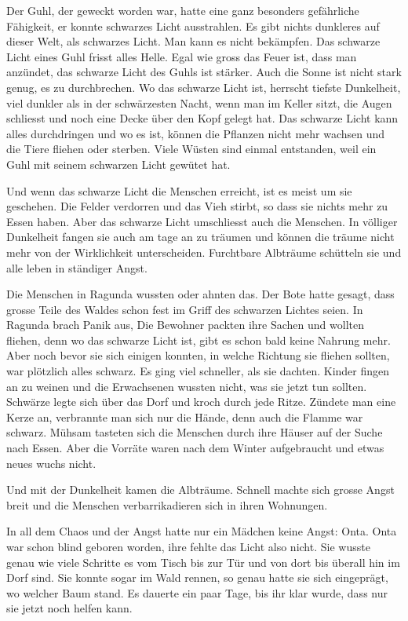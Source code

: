Der Guhl, der geweckt worden war, hatte eine ganz besonders gefährliche Fähigkeit, er konnte schwarzes Licht ausstrahlen. Es gibt nichts dunkleres auf dieser Welt, als schwarzes Licht. Man kann es nicht bekämpfen. Das schwarze Licht eines Guhl frisst alles Helle. Egal wie gross das Feuer ist, dass man anzündet, das schwarze Licht des Guhls ist stärker. Auch die Sonne ist nicht stark genug, es zu durchbrechen. Wo das schwarze Licht ist, herrscht tiefste Dunkelheit, viel dunkler als in der schwärzesten Nacht, wenn man im Keller sitzt, die Augen schliesst und noch eine Decke über den Kopf gelegt hat. Das schwarze Licht kann alles durchdringen und wo es ist, können die Pflanzen nicht mehr wachsen und die Tiere fliehen oder sterben. Viele Wüsten sind einmal entstanden, weil ein Guhl mit seinem schwarzen Licht gewütet hat. 

Und wenn das schwarze Licht die Menschen erreicht, ist es meist um sie geschehen. Die Felder verdorren und das Vieh stirbt, so dass sie nichts mehr zu Essen haben. Aber das schwarze Licht umschliesst auch die Menschen. In völliger Dunkelheit fangen sie auch am tage an zu träumen und können die träume nicht mehr von der Wirklichkeit unterscheiden. Furchtbare Albträume schütteln sie und alle leben in ständiger Angst.


Die Menschen in Ragunda wussten oder ahnten das. Der Bote hatte gesagt, dass grosse Teile des Waldes schon fest im Griff des schwarzen Lichtes seien. In Ragunda brach Panik aus, Die Bewohner packten ihre Sachen und wollten fliehen, denn wo das schwarze Licht ist, gibt es schon bald keine Nahrung mehr. Aber noch bevor sie sich einigen konnten, in welche Richtung sie fliehen sollten, war plötzlich alles schwarz. Es ging viel schneller, als sie dachten. Kinder fingen an zu weinen und die Erwachsenen wussten nicht, was sie jetzt tun sollten. Schwärze legte sich über das Dorf und kroch durch jede Ritze. Zündete man eine Kerze an, verbrannte man sich nur die Hände, denn auch die Flamme war schwarz. Mühsam tasteten sich die Menschen durch ihre Häuser auf der Suche nach Essen. Aber die Vorräte waren nach dem Winter aufgebraucht und etwas neues wuchs nicht.

Und mit der Dunkelheit kamen die Albträume. Schnell machte sich grosse Angst breit und die Menschen verbarrikadieren sich in ihren Wohnungen. 

In all dem Chaos und der Angst hatte nur ein Mädchen keine Angst: Onta. Onta war schon blind geboren worden, ihre fehlte das Licht also nicht. Sie wusste genau wie viele Schritte es vom Tisch bis zur Tür und von dort bis überall hin im Dorf sind. Sie konnte sogar im Wald rennen, so genau hatte sie sich eingeprägt, wo welcher Baum stand. Es dauerte ein paar Tage, bis ihr klar wurde, dass nur sie jetzt noch helfen kann.

